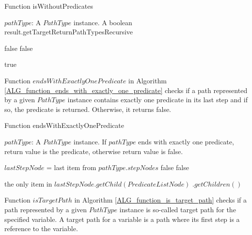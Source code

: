 \begin{algorithm}
\caption{Function isWithoutPredicates}
\label{ALG_function_is_without_predicates}
\begin{algorithmic}[1]
\REQUIRE $pathType$: A $PathType$ instance.
\ENSURE A boolean result.getTargetReturnPathTypesRecursive

		\RETURN false
	\ENDIF
			\RETURN false
		\ENDIF
	\ENDIF
\ENDFOR

\RETURN true
\end{algorithmic}
\end{algorithm}

Function $endsWithExactlyOnePredicate$ in Algorithm \ref{ALG_function_ends_with_exactly_one_predicate} checks if a path represented by a given $PathType$ instance contains exactly one predicate in its last step and if so, the predicate is returned. Otherwise, it returns false.

\begin{algorithm}
\caption{Function endsWithExactlyOnePredicate}
\label{ALG_function_ends_with_exactly_one_predicate}
\begin{algorithmic}[1]
\REQUIRE $pathType$: A $PathType$ instance.
\ENSURE If $pathType$ ends with exactly one predicate, return value is the predicate, otherwise return value is false.

\STATE $lastStepNode$ = last item from $pathType.stepNodes$
	\RETURN false
\ENDIF
{}
	\RETURN false
\ENDIF

\RETURN the only item in $lastStepNode.getChild(PredicateListNode)$ $.getChildren()$
\end{algorithmic}
\end{algorithm}

Function $isTargetPath$ in Algorithm \ref{ALG_function_is_target_path} checks if a path represented by a given $PathType$ instance is so-called target path for the specified variable. A target path for a variable is a path where its first step is a reference to the variable.

